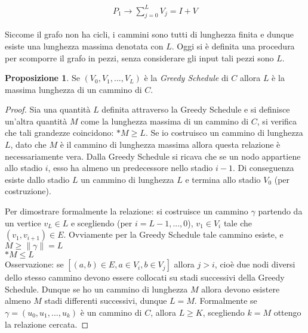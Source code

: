 \documentclass[a4paper,portrait,12pt]{article}
\theoremstyle{definition}
\newtheorem{proposition}{Proposizione}
\begin{document}
\begin{align*}
P_1 \to \sum_{j=0}^L V_j = I + V
\end{align*}

Siccome il grafo non ha cicli, i cammini sono tutti di lunghezza finita e dunque esiste una lunghezza massima denotata con $L$.
Oggi si è definita una procedura per scomporre il grafo in pezzi, senza considerare gli input tali pezzi sono $L$.

\begin{proposition}
Se $(V_0,V_1,...,V_L)$ è la \textit{Greedy Schedule} di $C$ allora $L$ è la massima lunghezza di un cammino di $C$.
\end{proposition}
\begin{proof}
Sia una quantità $L$ definita attraverso la Greedy Schedule e si definisce un’altra quantità $M$ come la lunghezza massima di un cammino di $C$, si verifica che tali grandezze coincidono: $* M \ge L$.
Se io costruisco un cammino di lunghezza $L$, dato che $M$ è il cammino di lunghezza massima allora questa relazione è necessariamente vera.
Dalla Greedy Schedule si ricava che se un nodo appartiene allo stadio $i$, esso ha almeno un predecessore nello stadio $i-1$.
Di conseguenza esiste dallo stadio $L$ un cammino di lunghezza $L$ e termina allo stadio $V_0$ (per costruzione).

Per dimostrare formalmente la relazione: si costruisce un cammino $\gamma$ partendo da un vertice $v_L \in L$ e scegliendo (per $i = L-1,...,0$), $v_1 \in V_i$ tale che $(v_1, v_{i+1}) \in E$.
Ovviamente per la Greedy Schedule tale cammino esiste, e $M \ge \| \gamma \| = L$\\
$* M \le L$\\
Osservazione: se $[(a,b) \in E,a \in V_i, b \in V_j]$ allora $j > i$, cioè due nodi diversi dello stesso cammino devono essere collocati su stadi successivi della Greedy Schedule.
Dunque se ho un cammino di lunghezza $M$ allora devono esistere almeno $M$ stadi differenti successivi, dunque $L = M$.
Formalmente se $\gamma = (u_0, u_1,...,u_k)$ è un cammino di $C$, allora $L \ge K$, scegliendo $k = M$ ottengo la relazione cercata.
\end{proof}
\end{document}
